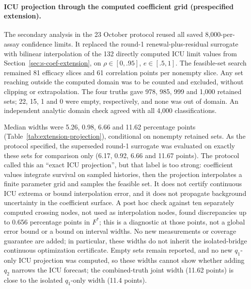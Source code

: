 \paragraph{ICU projection through the computed coefficient grid (prespecified extension).}
The secondary analysis in the 23 October protocol reused all saved 8,000-per-assay
confidence limits. It replaced the round-1 renewal-plus-residual surrogate with
bilinear interpolation of the 132 directly computed ICU limit values from
Section~\ref{sec:s-coef-extension}, on $\rho\in[0,.95]$, $e\in[.5,1]$.
The feasible-set search remained 81 efficacy slices and 61 correlation points
per nonempty slice. Any set reaching outside the computed domain was to be
counted and excluded, without clipping or extrapolation. The four truths gave
978, 985, 999 and 1,000 retained sets; 22, 15, 1 and 0 were empty, respectively,
and none was out of domain. An independent analytic domain check agreed with
all 4,000 classifications.

Median widths were 5.26, 0.98, 6.66 and 11.62 percentage points
(Table~\ref{tab:extension-projection}), conditional on nonempty retained sets.
As the protocol specified, the superseded round-1 surrogate was evaluated on
exactly these sets for comparison only (6.17, 0.92, 6.66 and 11.67 points).
The protocol called this an ``exact ICU projection'', but that label
is too strong: coefficient values integrate survival on sampled histories,
then the projection interpolates a finite parameter grid and samples the
feasible set. It does not certify continuous ICU extrema or bound interpolation
error, and it does not propagate background uncertainty in the coefficient
surface. A post hoc check against ten separately computed crossing nodes,
not used as interpolation nodes, found discrepancies up to 0.656 percentage
points in $F^*$; this is a diagnostic at those points, not a global error bound
or a bound on interval widths. No new measurements or coverage guarantee are added;
in particular, these widths do not inherit the isolated-bridge continuous
optimization certificate. Empty sets remain reported, and no new $q_1$-only
ICU projection was computed, so these widths cannot show whether adding $q_2$
narrows the ICU forecast; the combined-truth joint width (11.62 points) is close
to the isolated $q_1$-only width (11.4 points).

